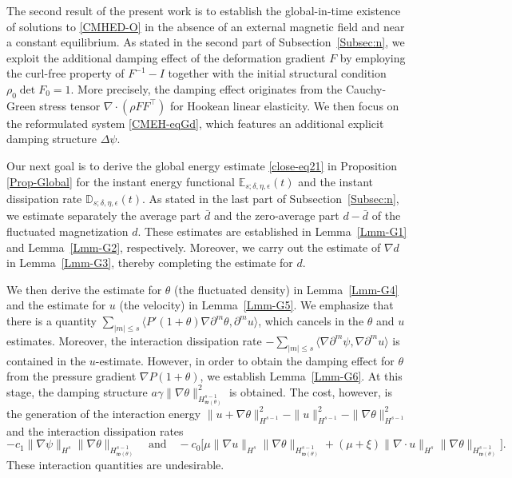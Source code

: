 \documentclass[reqno,11pt]{amsart}
\numberwithin{equation}{section}
\def\w{\mathfrak{w}}
\begin{document}
The second result of the present work is to establish the global-in-time existence of solutions to \eqref{CMHED-O} in the absence of an external magnetic field and near a constant equilibrium. As stated in the second part of Subsection~\ref{Subsec:n}, we exploit the additional damping effect of the deformation gradient \(F\) by employing the curl-free property of \(F^{-1} - I\) together with the initial structural condition \(\rho_0 \det F_0 = 1\). More precisely, the damping effect originates from the Cauchy-Green stress tensor \(\nabla \cdot (\rho F F^\top)\) for Hookean linear elasticity. We then focus on the reformulated system \eqref{CMEH-eqGd}, which features an additional explicit damping structure \(\Delta \psi\).

Our next goal is to derive the global energy estimate \eqref{close-eq21} in Proposition \ref{Prop-Global} for the instant energy functional \( \mathbb{E}_{s; \delta,\eta,\epsilon} (t) \) and the instant dissipation rate \( \mathbb{D}_{s; \delta,\eta,\epsilon} (t) \). As stated in the last part of Subsection~\ref{Subsec:n}, we estimate separately the average part \( \bar{d} \) and the zero-average part \( d - \bar{d} \) of the fluctuated magnetization \( d \). These estimates are established in Lemma~\ref{Lmm-G1} and Lemma~\ref{Lmm-G2}, respectively. Moreover, we carry out the estimate of \( \nabla {d} \) in Lemma~\ref{Lmm-G3}, thereby completing the estimate for \( d \).  

We then derive the estimate for \(\theta\) (the fluctuated density) in Lemma~\ref{Lmm-G4} and the estimate for \(u\) (the velocity) in Lemma~\ref{Lmm-G5}. We emphasize that there is a quantity \(\sum_{|m| \leq s} \langle P'(1+\theta) \nabla \partial^m \theta, \partial^m u \rangle\), which cancels in the \(\theta\) and \(u\) estimates. Moreover, the interaction dissipation rate \(-\sum_{|m| \leq s} \langle \nabla \partial^m \psi, \nabla \partial^m u \rangle\) is contained in the \(u\)-estimate. However, in order to obtain the damping effect for \(\theta\) from the pressure gradient \(\nabla P(1+\theta)\), we establish Lemma~\ref{Lmm-G6}. At this stage, the damping structure \(a \gamma \| \nabla \theta \|^2_{H^{s-1}_{\w (\theta)}}\) is obtained. The cost, however, is the generation of the interaction energy \(\|u + \nabla \theta \|_{H^{s-1}}^2 - \|u\|_{H^{s-1}}^2 - \|\nabla \theta \|_{H^{s-1}}^2\) and the interaction dissipation rates 
\[
- c_1 \|\nabla \psi \|_{H^s} \| \nabla \theta \|_{H^{s-1}_{\w (\theta)}} 
\quad \text{and} \quad
- c_0 \bigl[ \mu \| \nabla u\|_{H^s} \| \nabla \theta \|_{H^{s-1}_{\w (\theta)}} + (\mu + \xi) \|\nabla \cdot u\|_{H^s} \| \nabla \theta \|_{H^{s-1}_{\w (\theta)}} \bigr].
\]
These interaction quantities are undesirable.  
\end{document}
